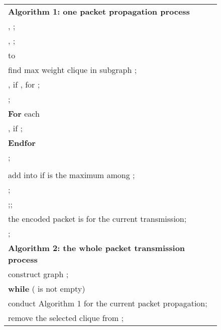 \documentclass[journal]{IEEEtran}
\begin{document}
\begin{figure}[t]\center
\scriptsize{
\begin{tabular}{|l|}
\hline {\bf Algorithm 1: one packet propagation process}\\
\hspace{2mm} , ;\\
\hspace{2mm} , ;\\
\hspace{2mm}{\bf for}  to \\
\hspace{4mm} find max weight clique  in subgraph ;\\
\hspace{4mm} , if , for ;\\
\hspace{4mm} ;\\
\hspace{4mm} {\bf For} each \\
\hspace{6mm} , if ;\\
\hspace{4mm} {\bf Endfor}\\
\hspace{4mm} ;\\
\hspace{2mm}{\bf Endfor}\\
\hspace{2mm} add  into  if  is the maximum among ;\\
\hspace{2mm} ;\\
\hspace{2mm} ;;\\
\hspace{2mm} the encoded packet is  for the current transmission;\\
\hspace{2mm} ;\\
\hline
\hline {\bf Algorithm 2: the whole packet transmission process}\\
\hspace{2mm} construct graph ;\\
\hspace{2mm} {\bf while} ( is not empty)\\
\hspace{4mm} conduct Algorithm 1 for the current packet propagation;\\
\hspace{4mm} remove the selected clique from ;\\

\end{tabular}}
\end{figure}
\end{document}
